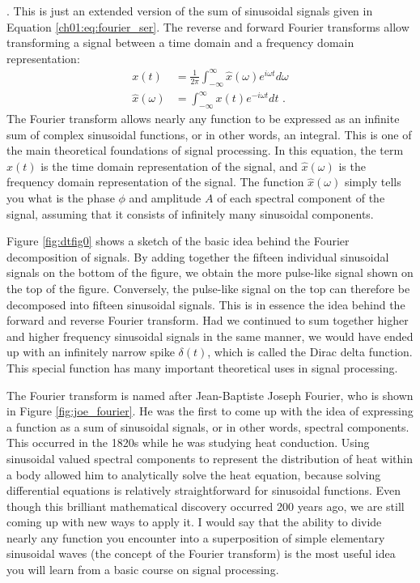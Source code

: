 .
This is just an extended version of the sum of sinusoidal signals given in Equation \ref{ch01:eq:fourier_ser}. The
reverse and forward Fourier transforms allow transforming a signal
between a time domain and a frequency domain representation:
\begin{align}
	x(t)            & = \frac{1}{2\pi}\int_{-\infty}^{\infty} \hat{x}(\omega) e^{i\omega t} d\omega \\
	\hat{x}(\omega) & = \int_{-\infty}^{\infty} x(t) e^{-i\omega t} dt \,\,.
\end{align}
The Fourier transform allows nearly any function to be expressed as an
infinite sum of complex sinusoidal functions, or in other words, an
integral. This is one of the main theoretical foundations of signal
processing. In this equation, the term $x(t)$ is the time domain
representation of the signal, and $\hat{x}(\omega)$ is the frequency
domain representation of the signal. The function $\hat{x}(\omega)$
simply tells you what is the phase $\phi$ and amplitude $A$ of
each spectral component of the signal, assuming that it consists of
infinitely many sinusoidal components.

Figure \ref{fig:dtfig0} shows a sketch of the basic idea behind the
Fourier decomposition of signals. By adding together the fifteen
individual sinusoidal signals on the bottom of the figure, we obtain
the more pulse-like signal shown on the top of the figure. Conversely,
the pulse-like signal on the top can therefore be decomposed into
fifteen sinusoidal signals. This is in essence the idea behind the
forward and reverse Fourier transform. Had we continued to sum
together higher and higher frequency sinusoidal signals in the same
manner, we would have ended up with an infinitely narrow spike
$\delta(t)$, which is called the Dirac delta function. This special
function has many important theoretical uses in signal
processing.

The Fourier transform is named after Jean-Baptiste Joseph Fourier, who
is shown in Figure \ref{fig:joe_fourier}. He was the first to come up
with the idea of expressing a function as a sum of sinusoidal signals,
or in other words, spectral components. This occurred in the 1820s
while he was studying heat conduction. Using sinusoidal valued
spectral components to represent the distribution of heat within a
body allowed him to analytically solve the heat equation, because
solving differential equations is relatively straightforward for
sinusoidal functions. Even though this brilliant mathematical
discovery occurred 200 years ago, we are still coming up with new ways
to apply it. I would say that the ability to divide nearly any function you
encounter into a superposition of simple elementary sinusoidal waves
(the concept of the Fourier transform) is the most useful idea you
will learn from a basic course on signal processing.

